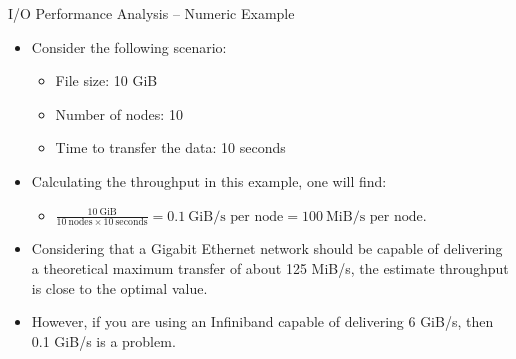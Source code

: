\documentclass[compress,11pt,xcolor=svgnames,aspectratio=169]{beamer}
\begin{document}
\begin{frame}[fragile]{I/O Performance Analysis -- Numeric Example}

\begin{itemize}
\setlength\itemsep{0.2cm}

  \item Consider the following scenario:

    \begin{itemize}
    \setlength\itemsep{0.1cm}
      \item File size: 10 GiB
      \item Number of nodes: 10
      \item Time to transfer the data: 10 seconds
    \end{itemize}

  \item Calculating the throughput in this example, one will find:\\[0.2cm]

    \begin{itemize}
    \setlength\itemsep{0.2cm}
      \item $\displaystyle \frac{10\ \text{GiB}}{10\ \text{nodes} \times 10\ \text{seconds}} = 0.1\ \text{GiB/s per node} = 100\ \text{MiB/s per node}$.
    \end{itemize}

  \item Considering that a Gigabit Ethernet network should be capable of delivering a theoretical maximum transfer of about 125 MiB/s, the estimate throughput is close to the optimal value.

  \item However, if you are using an Infiniband capable of delivering 6 GiB/s, then 0.1 GiB/s is a problem.

\end{itemize}

\end{frame}
\end{document}
